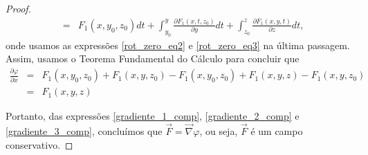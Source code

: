 \begin{proof}
\begin{eqnarray*}
&=&F_1(x,y_0,z_0) d t+ \int_{y_0}^y \frac{\partial F_1(x,t,z_0)}{\partial y}dt+ \int_{z_0}^z \frac{\partial F_1(x,y,t)}{\partial z}dt,
\end{eqnarray*}
onde usamos as expressões \eqref{rot_zero_eq2} e \eqref{rot_zero_eq3} na última passagem. Assim, usamos o Teorema Fundamental do Cálculo para concluir que
\begin{eqnarray}
\nonumber \frac{\partial \varphi}{\partial x}&=&F_1(x,y_0,z_0)+F_1(x,y,z_0)-F_1(x,y_0,z_0)+F_1(x,y,z)-F_1(x,y,z_0)\\
&=&F_1(x,y,z)\label{gradiente_1_comp}
\end{eqnarray}

Portanto, das expressões \eqref{gradiente_1_comp}, \eqref{gradiente_2_comp} e \eqref{gradiente_3_comp}, concluímos que $\vec{F}=\vec{\nabla}\varphi$, ou seja, $\vec{F}$ é um campo conservativo.
\end{proof}

